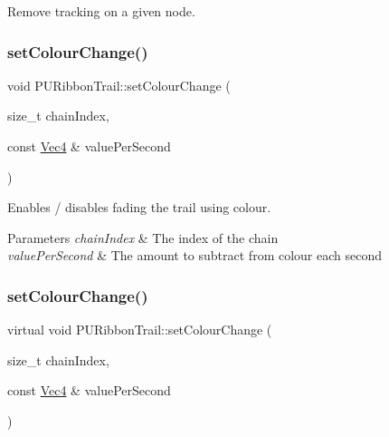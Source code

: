 Remove tracking on a given node. \mbox{\label{classPURibbonTrail_a110171311c7a9bd54e247133943fd4c7}} 
\subsubsection{\texorpdfstring{set\+Colour\+Change()}{setColourChange()}\hspace{0.1cm}{\footnotesize\ttfamily [1/4]}}
{\footnotesize\ttfamily void P\+U\+Ribbon\+Trail\+::set\+Colour\+Change (\begin{DoxyParamCaption}\item[{size\+\_\+t}]{chain\+Index,  }\item[{const \hyperlink{classVec4}{Vec4} \&}]{value\+Per\+Second }\end{DoxyParamCaption})\hspace{0.3cm}{\ttfamily [virtual]}}

Enables / disables fading the trail using colour. 
\begin{DoxyParams}{Parameters}
{\em chain\+Index} & The index of the chain \\
\hline
{\em value\+Per\+Second} & The amount to subtract from colour each second \\
\hline
\end{DoxyParams}
\mbox{\label{classPURibbonTrail_a1749004a876834e8cf875abd9fe969e3}} 
\subsubsection{\texorpdfstring{set\+Colour\+Change()}{setColourChange()}\hspace{0.1cm}{\footnotesize\ttfamily [2/4]}}
{\footnotesize\ttfamily virtual void P\+U\+Ribbon\+Trail\+::set\+Colour\+Change (\begin{DoxyParamCaption}\item[{size\+\_\+t}]{chain\+Index,  }\item[{const \hyperlink{classVec4}{Vec4} \&}]{value\+Per\+Second }\end{DoxyParamCaption})\hspace{0.3cm}{\ttfamily [virtual]}}


